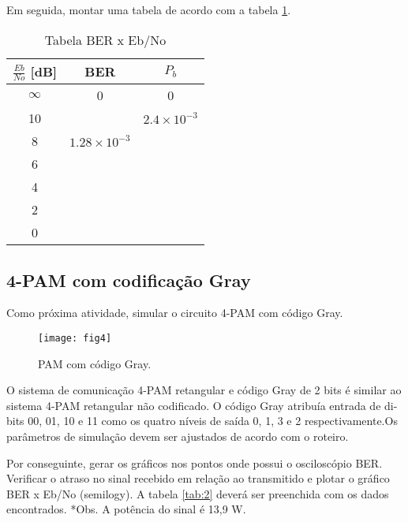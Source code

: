 Em seguida, montar uma tabela de acordo com a tabela \ref{tab:1}.

\begin{small}
    \begin{table}[H]
        \begin{center}
            \caption{Tabela BER x Eb/No}
            \begin{tabular}{c|c|c}
                \hline
                $\frac{Eb}{No}$ [dB] & BER & $P_b$ \\
                \hline
                $\infty$ & 0 & 0 \\
                \hline
                10 & & $2.4 \times 10^{-3} $\\
                \hline
                8 & $1.28 \times 10^{-3}$ & \\
                \hline
                6 & & \\
                \hline
                4 & & \\
                \hline
                2 & & \\
                \hline
                0 & & \\
                \hline
            \end{tabular}
            \label{tab:1}
        \end{center}
    \end{table}
\end{small}


\subsection{4-PAM com codificação Gray}
Como próxima atividade, simular o circuito 4-PAM com código Gray.

\begin{figure}[H]
    \centering
    \texttt{[image: fig4]}
    \caption{PAM com código Gray.}
    \label{fig:4}
\end{figure}

O sistema de comunicação 4-PAM retangular e código Gray de 2 bits é similar ao sistema 4-PAM retangular não codificado. O código Gray atribuía entrada de di-bits 00, 01, 10 e 11 como os quatro níveis de saída 0, 1, 3 e 2 respectivamente.Os parâmetros de simulação devem ser ajustados de acordo com o roteiro.

Por conseguinte, gerar os gráficos nos pontos onde possui o osciloscópio BER. Verificar o atraso no sinal recebido em relação ao transmitido e plotar o gráfico BER x Eb/No (semilogy). A tabela \ref{tab:2} deverá ser preenchida com os dados encontrados. *Obs. A potência do sinal  é 13,9 W.

